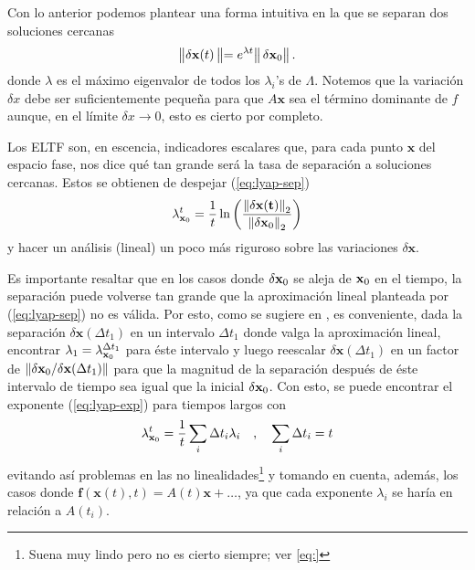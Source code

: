 
Con lo anterior podemos plantear una forma intuitiva en la que se separan dos soluciones cercanas
\begin{equation}
 \left\lVert \mathbf{\delta x}(t) \left\lVert = e^{\lambda t} \right\rVert \mathbf{\delta x}_0 \right\rVert.
 \label{eq:lyap-sep}
\end{equation}
donde $\lambda$ es el máximo eigenvalor de todos los $\lambda_i$'s de $\Lambda$. Notemos que la variación $\delta x$ debe ser suficientemente pequeña para que $A\mathbf{x}$ sea el término dominante de $f$ aunque, en el límite $\delta x \to 0$, esto es cierto por completo. 

Los ELTF son, en escencia, indicadores escalares que, para cada punto $\mathbf{x}$ del espacio fase, nos dice qué tan grande será la tasa de separación a soluciones cercanas. Estos se obtienen de despejar (\ref{eq:lyap-sep})
\begin{equation}
 \lambda_{\mathbf{x}_0}^t = \frac{1}{t}\ln \left( \frac{\left\lVert\mathbf{ \delta x(t)} \right\rVert_2}{\left\lVert \mathbf{\delta x}_0 \right\rVert_2} \right)
 \label{eq:lyap-exp}
\end{equation}
y hacer un análisis (lineal) un poco más riguroso sobre las variaciones $\delta \mathbf{x}$.

Es importante resaltar que en los casos donde $\delta \mathbf{x}_0$ se aleja de $\mathbf{x}_0$ en el tiempo, la separación puede volverse tan grande que la aproximación lineal planteada por (\ref{eq:lyap-sep}) no es válida. Por esto, como se sugiere en \cite{ChaosBook}, es conveniente, dada la separación  $\delta \mathbf{x}(\Delta t_1)$ en un intervalo $\Delta t_1$ donde valga la aproximación lineal, encontrar $\lambda_1 = \lambda_{\mathbf{x}_0}^{\Delta t_1}$ para éste intervalo y luego reescalar $\delta \mathbf{x}(\Delta t_1)$ en un factor de $\left\lVert \delta \mathbf{x}_0 / \delta \mathbf{x}(\Delta t_1) \right\rVert$ para que la magnitud de la separación después de éste intervalo de tiempo sea igual que la inicial $\delta \mathbf{x}_0$. Con esto, se puede encontrar el exponente (\ref{eq:lyap-exp}) para tiempos largos con
\begin{equation*}
 \lambda_{\mathbf{x}_0}^t = \frac{1}{t} \sum_{i} \Delta t_i \lambda_i
    \quad\text{,}\quad 
 \sum_i \Delta t_i = t
\end{equation*}
evitando así problemas en las no linealidades\footnote{Suena muy lindo pero no es cierto siempre; ver \ref{eq:} } y tomando en cuenta, además, los casos donde $\mathbf{f}(\mathbf{x}(t),t) = A(t)\mathbf{x} + \ldots $, ya que cada exponente $\lambda_i$ se haría en relación a $A(t_i)$.

